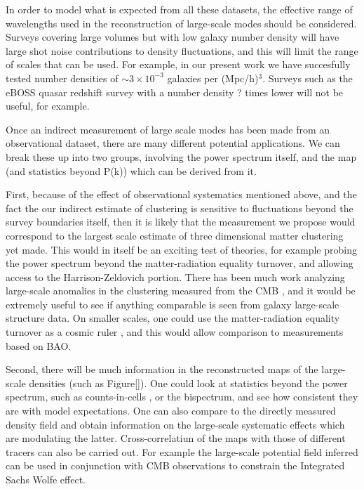 \documentclass[prd,amsmath,amssymb,floatfix,superscriptaddress,nofootinbib,twocolumn]{revtex4-1}
\begin{document}
In order to model what is expected from all these datasets, the effective
range of wavelengths used in the reconstruction of large-scale modes
should be considered. Surveys covering large volumes but
with low galaxy number density will have large
shot noise contributions to density fluctuations, and this
will limit the range of scales that can be used. For example, in
our present work we have succesfully
tested number densities of $\sim 3\times10^{-3}$
galaxies per (Mpc/h)$^{3}$. Surveys such as the eBOSS quasar redshift
survey \cite{ebossquasars} with a number density ? times lower will
not be useful, for example.

Once an indirect measurement of large scale modes has been made from
an observational dataset, there are many different potential
applications. We can break these up into two groups, involving the
power spectrum itself, and the map (and statistics beyond P(k))
which can be derived from it.

First, because of the effect of observational systematics mentioned above,
and the fact the our indirect estimate of clustering is sensitive
to fluctuations beyond the survey boundaries itself, then it is likely
that the measurement we propose would correspond to the largest scale
estimate of three dimensional matter clustering yet made. This would in
itself be an exciting test of theories, for example probing the power
spectrum beyond the matter-radiation equality turnover, and allowing
access to the Harrison-Zeldovich portion. There has been much work
analyzing large-scale anomalies in the clustering measured from
the CMB \cite{many}, and it would be extremely useful to see if anything
comparable is seen from galaxy large-scale structure data. On smaller
scales, one could use the matter-radiation equality turnover as
a cosmic ruler \cite{}, and this would allow comparison to measurements
based on BAO.

Second, there will be much information in the reconstructed maps
of the large-scale densities (such as Figure\ref{}). One could look at
statistics beyond the power spectrum, such as counts-in-cells
\cite{}, or the bispectrum, and see how consistent they are with
model expectations. One can also compare to the directly measured
density field and obtain information on the large-scale systematic
effects which are modulating the latter. Cross-correlatiun of the maps
with those of different tracers can also be carried out. For example the
large-scale potential field inferred can be used in conjunction with
CMB observations to constrain the Integrated Sachs Wolfe effect.
\end{document}
